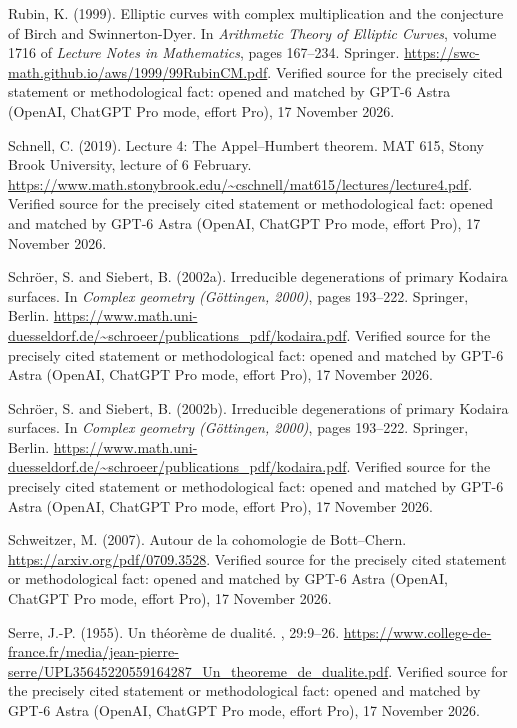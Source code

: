\begin{thebibliography}{}
Rubin, K. (1999).
\newblock Elliptic curves with complex multiplication and the conjecture of
  {B}irch and {S}winnerton-{D}yer.
\newblock In {\em Arithmetic Theory of Elliptic Curves}, volume 1716 of {\em
  Lecture Notes in Mathematics}, pages 167--234. Springer.
\newblock \url{https://swc-math.github.io/aws/1999/99RubinCM.pdf}. Verified source for the precisely cited statement or methodological fact: opened and matched by GPT-6 Astra (OpenAI, ChatGPT Pro mode, effort Pro), 17 November 2026.

Schnell, C. (2019).
\newblock Lecture 4: The {Appel--Humbert} theorem.
\newblock MAT 615, Stony Brook University, lecture of 6 February.
\newblock \url{https://www.math.stonybrook.edu/~cschnell/mat615/lectures/lecture4.pdf}. Verified source for the precisely cited statement or methodological fact: opened and matched by GPT-6 Astra (OpenAI, ChatGPT Pro mode, effort Pro), 17 November 2026.

Schr{\"o}er, S. and Siebert, B. (2002a).
\newblock Irreducible degenerations of primary {K}odaira surfaces.
\newblock In {\em Complex geometry (G{\"o}ttingen, 2000)}, pages 193--222.
  Springer, Berlin.
\newblock \url{https://www.math.uni-duesseldorf.de/~schroeer/publications_pdf/kodaira.pdf}. Verified source for the precisely cited statement or methodological fact: opened and matched by GPT-6 Astra (OpenAI, ChatGPT Pro mode, effort Pro), 17 November 2026.

Schr{\"o}er, S. and Siebert, B. (2002b).
\newblock Irreducible degenerations of primary {Kodaira} surfaces.
\newblock In {\em Complex geometry ({G}{\"o}ttingen, 2000)}, pages 193--222.
  Springer, Berlin.
\newblock \url{https://www.math.uni-duesseldorf.de/~schroeer/publications_pdf/kodaira.pdf}. Verified source for the precisely cited statement or methodological fact: opened and matched by GPT-6 Astra (OpenAI, ChatGPT Pro mode, effort Pro), 17 November 2026.

Schweitzer, M. (2007).
\newblock Autour de la cohomologie de {Bott--Chern}.
\newblock \url{https://arxiv.org/pdf/0709.3528}. Verified source for the precisely cited statement or methodological fact: opened and matched by GPT-6 Astra (OpenAI, ChatGPT Pro mode, effort Pro), 17 November 2026.

Serre, J.-P. (1955).
\newblock Un th{\'e}or{\`e}me de dualit{\'e}.
, 29:9--26.
\newblock \url{https://www.college-de-france.fr/media/jean-pierre-serre/UPL35645220559164287_Un_theoreme_de_dualite.pdf}. Verified source for the precisely cited statement or methodological fact: opened and matched by GPT-6 Astra (OpenAI, ChatGPT Pro mode, effort Pro), 17 November 2026.


\end{thebibliography}
